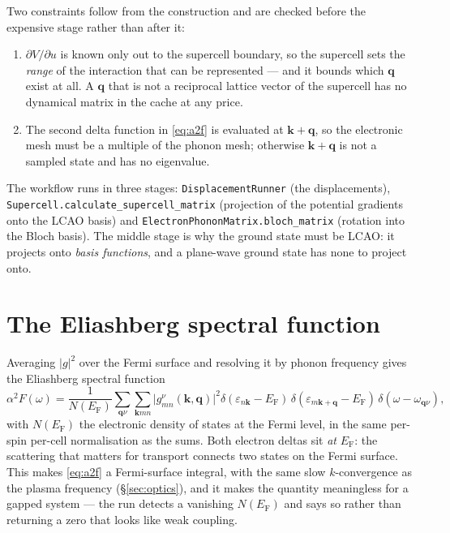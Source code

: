 Two constraints follow from the construction and are checked before the
expensive stage rather than after it:
\begin{enumerate}
  \item $\partial V/\partial u$ is known only out to the supercell boundary, so
    the supercell sets the \emph{range} of the interaction that can be
    represented --- and it bounds which $\mathbf{q}$ exist at all. A
    $\mathbf{q}$ that is not a reciprocal lattice vector of the supercell has
    no dynamical matrix in the cache at any price.
  \item The second delta function in \eqref{eq:a2f} is evaluated at
    $\mathbf{k}{+}\mathbf{q}$, so the electronic mesh must be a multiple of the
    phonon mesh; otherwise $\mathbf{k}{+}\mathbf{q}$ is not a sampled state and
    has no eigenvalue.
\end{enumerate}

The workflow runs in three stages: \texttt{DisplacementRunner} (the
displacements), \texttt{Supercell.calculate\_supercell\_matrix} (projection of
the potential gradients onto the LCAO basis) and
\texttt{ElectronPhononMatrix.bloch\_matrix} (rotation into the Bloch basis).
The middle stage is why the ground state must be LCAO: it projects onto
\emph{basis functions}, and a plane-wave ground state has none to project onto.

\section{The Eliashberg spectral function}

Averaging $|g|^2$ over the Fermi surface and resolving it by phonon frequency
gives the Eliashberg spectral function
\begin{equation}
  \alpha^2F(\omega) = \frac{1}{N(E_\mathrm{F})}
    \sum_{\mathbf{q}\nu}\sum_{\mathbf{k}mn}
    \bigl|g_{mn}^{\nu}(\mathbf{k},\mathbf{q})\bigr|^2
    \delta(\varepsilon_{n\mathbf{k}} - E_\mathrm{F})\,
    \delta(\varepsilon_{m\mathbf{k}+\mathbf{q}} - E_\mathrm{F})\,
    \delta(\omega - \omega_{\mathbf{q}\nu}) ,
  \label{eq:a2f}
\end{equation}
with $N(E_\mathrm{F})$ the electronic density of states at the Fermi level, in
the same per-spin per-cell normalisation as the sums. Both electron deltas sit
\emph{at} $E_\mathrm{F}$: the scattering that matters for transport connects
two states on the Fermi surface. This makes \eqref{eq:a2f} a Fermi-surface
integral, with the same slow $k$-convergence as the plasma frequency
(\S\ref{sec:optics}), and it makes the quantity meaningless for a gapped
system --- the run detects a vanishing $N(E_\mathrm{F})$ and says so rather
than returning a zero that looks like weak coupling.

